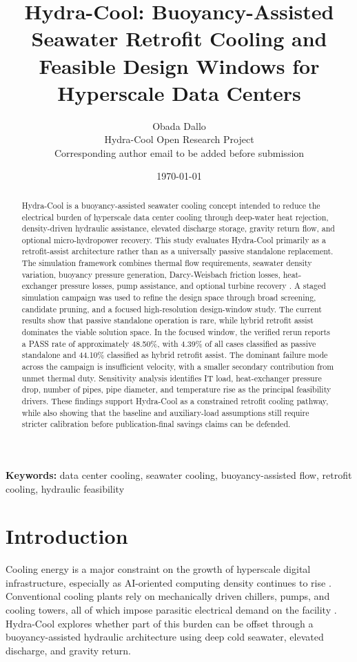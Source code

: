 \documentclass[11pt]{article}
\title{\textbf{Hydra-Cool: Buoyancy-Assisted Seawater Retrofit Cooling and Feasible Design Windows for Hyperscale Data Centers}}
\author{Obada Dallo\\
\small Hydra-Cool Open Research Project\\
\small Corresponding author email to be added before submission}
\date{\today}
\begin{document}
\maketitle

\begin{abstract}
Hydra-Cool is a buoyancy-assisted seawater cooling concept intended to reduce the electrical burden of hyperscale data center cooling through deep-water heat rejection, density-driven hydraulic assistance, elevated discharge storage, gravity return flow, and optional micro-hydropower recovery. This study evaluates Hydra-Cool primarily as a retrofit-assist architecture rather than as a universally passive standalone replacement. The simulation framework combines thermal flow requirements, seawater density variation, buoyancy pressure generation, Darcy-Weisbach friction losses, heat-exchanger pressure losses, pump assistance, and optional turbine recovery \citep{fofonoff1983,ebrahimi2014,swamee1976,pal2021,swart2020}. A staged simulation campaign was used to refine the design space through broad screening, candidate pruning, and a focused high-resolution design-window study. The current results show that passive standalone operation is rare, while hybrid retrofit assist dominates the viable solution space. In the focused window, the verified rerun reports a PASS rate of approximately 48.50\%, with 4.39\% of all cases classified as passive standalone and 44.10\% classified as hybrid retrofit assist. The dominant failure mode across the campaign is insufficient velocity, with a smaller secondary contribution from unmet thermal duty. Sensitivity analysis identifies IT load, heat-exchanger pressure drop, number of pipes, pipe diameter, and temperature rise as the principal feasibility drivers. These findings support Hydra-Cool as a constrained retrofit cooling pathway, while also showing that the baseline and auxiliary-load assumptions still require stricter calibration before publication-final savings claims can be defended.
\end{abstract}

\noindent\textbf{Keywords:} data center cooling, seawater cooling, buoyancy-assisted flow, retrofit cooling, hydraulic feasibility

\section{Introduction}

Cooling energy is a major constraint on the growth of hyperscale digital infrastructure, especially as AI-oriented computing density continues to rise \citep{masanet2020,shehabi2024}. Conventional cooling plants rely on mechanically driven chillers, pumps, and cooling towers, all of which impose parasitic electrical demand on the facility \citep{greengrid2011,ebrahimi2014}. Hydra-Cool explores whether part of this burden can be offset through a buoyancy-assisted hydraulic architecture using deep cold seawater, elevated discharge, and gravity return.
\end{document}
